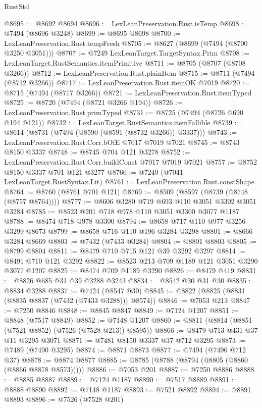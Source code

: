 \begin{lexlean}{RustStd}
\begin{coremodule}
{\begin{coremodule}
{{{{{{{{{{{{{{{{{{{{{{{{{{{{{{{{@8695 := @8692 @8694
@8696 := LexLeanPreservation.Rust.isTemp
@8698 := @7494 (@8696 @3248)
@8699 := @8695 @8698
@8700 := LexLeanPreservation.Rust.tempFresh
@8705 := @8627 (@8699 (@7494 (@8700 @3250 @3051)))
@8707 := @7249 LexLeanTarget.TargetSyntax.Prim
@8708 := LexLeanTarget.RustSemantics.itemPrimitive
@8711 := @8705 (@8707 (@8708 @3266))
@8712 := LexLeanPreservation.Rust.plainItem
@8715 := @8711 (@7494 (@8712 @3266))
@8717 := LexLeanPreservation.Rust.itemOK @7019
@8720 := @8715 (@7494 (@8717 @3266))
@8721 := LexLeanPreservation.Rust.itemTyped
@8725 := @8720 (@7494 (@8721 @3266 @194))
@8726 := LexLeanPreservation.Rust.primTyped
@8731 := @8725 (@7494 (@8726 @690 @194 @121))
@8732 := LexLeanTarget.RustSemantics.itemFallible
@8739 := @8614 (@8731 (@7494 (@8590 (@8591 (@8732 @3266)) @3337)))
@8743 := LexLeanPreservation.Rust.Corr.bOfE @7017 @7019 @7021
@8745 := @8743 @8150 @3337
@8748 := @8745 @704 @121 @3278
@8752 := LexLeanPreservation.Rust.Corr.buildConst @7017 @7019 @7021
@8757 := @8752 @8150 @3337 @701 @121 @3277
@8760 := @7249 (@7041 LexLeanTarget.RustSyntax.Lit)
@8761 := LexLeanPreservation.Rust.constShape
@8764 := @8760 (@8761 @701 @121)
@8769 := @8509 (@8597 (@8739 (@8748 (@8757 @8764))))
@8777 := @8606 @3280 @719 @693 @110 @3051 @3302 @3051 @3284
@8785 := @8523 @201 @718 @978 @110 @3051 @3300 @3077 @1187
@8788 := @8474 @718 @978 @3300
@8794 := @8658 @717 @110 @977 @3256 @3299 @8673
@8799 := @8658 @716 @110 @196 @3284 @3298
@8801 := @8666 @3284 @8669
@8803 := @7432 (@7433 @3284)
@8804 := @8801 @8803
@8805 := @8799 @8804
@8811 := @8479 @710 @715 @121 @39 @3292 @3297
@8814 := @8491 @710 @121 @3292
@8822 := @8523 @213 @709 @1189 @121 @3051 @3290 @3077 @1207
@8825 := @8474 @709 @1189 @3290
@8826 := @8479 @419
@8831 := @8826 @685 @31 @39 @3288 @3243
@8834 := @8542 @30 @31 @30
@8835 := @8834 @3288
@8837 := @7424 (@8547 @30)
@8845 := @8822 (@8825 (@8831 (@8835 @8837 (@7432 (@7433 @3288))) @8574))
@8846 := @7053 @213
@8847 := @7250 @8846
@8848 := @8845 @8847
@8849 := @7124 @1207
@8851 := @8848 (@7517 @8849)
@8852 := @7148 @1207
@8860 := @8811 (@8814 (@8851 (@7521 @8852) (@7526 (@7528 @213)) @8595))
@8866 := @8479 @713 @431 @37 @11 @3295 @3071
@8871 := @7481 @8150 @3337 @37 @712 @3295
@8873 := @7489 (@7490 @3295)
@8874 := @8871 @8873
@8877 := @7494 (@7496 @712 @37)
@8878 := @8874 @8877
@8885 := @8785 (@8788 (@8794 (@8805 (@8860 (@8866 @8878 @8573)))))
@8886 := @7053 @201
@8887 := @7250 @8886
@8888 := @8885 @8887
@8889 := @7124 @1187
@8890 := @7517 @8889
@8891 := @8888 @8890
@8892 := @7148 @1187
@8893 := @7521 @8892
@8894 := @8891 @8893
@8896 := @7526 (@7528 @201)
}}}}}}}}}}}}}}}}}}}}}}}}}}}}}}}}
\end{coremodule}}
\end{coremodule}
\end{lexlean}
